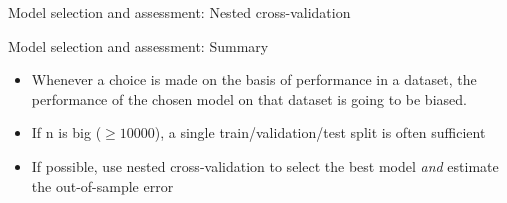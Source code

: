 \documentclass[10pt]{beamer}
\begin{document}
    \begin{frame}{Model selection and assessment: Nested cross-validation}
    \end{frame}

    \begin{frame}{Model selection and assessment: Summary}
        \begin{itemize}
            \item Whenever a choice is made on the basis of performance in a dataset, the performance of the chosen model on that dataset is going to be biased.
            \item If n is big ($\geq 10000$), a single train/validation/test split is often sufficient
            \item If possible, use nested cross-validation to select the best model \textit{and} estimate the out-of-sample error
        \end{itemize}
    \end{frame}
\end{document}
